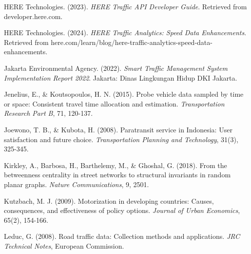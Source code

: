 \documentclass[12pt,a4paper]{article}
\begin{document}
HERE Technologies. (2023). \emph{HERE Traffic API Developer Guide}. Retrieved from developer.here.com.

HERE Technologies. (2024). \emph{HERE Traffic Analytics: Speed Data Enhancements}. Retrieved from here.com/learn/blog/here-traffic-analytics-speed-data-enhancements.

Jakarta Environmental Agency. (2022). \emph{Smart Traffic Management System Implementation Report 2022}. Jakarta: Dinas Lingkungan Hidup DKI Jakarta.

Jenelius, E., \& Koutsopoulos, H. N. (2015). Probe vehicle data sampled by time or space: Consistent travel time allocation and estimation. \emph{Transportation Research Part B}, 71, 120-137.


Joewono, T. B., \& Kubota, H. (2008). Paratransit service in Indonesia: User satisfaction and future choice. \emph{Transportation Planning and Technology}, 31(3), 325-345.

Kirkley, A., Barbosa, H., Barthelemy, M., \& Ghoshal, G. (2018). From the betweenness centrality in street networks to structural invariants in random planar graphs. \emph{Nature Communications}, 9, 2501.

Kutzbach, M. J. (2009). Motorization in developing countries: Causes, consequences, and effectiveness of policy options. \emph{Journal of Urban Economics}, 65(2), 154-166.



Leduc, G. (2008). Road traffic data: Collection methods and applications. \emph{JRC Technical Notes}, European Commission.


\end{document}

